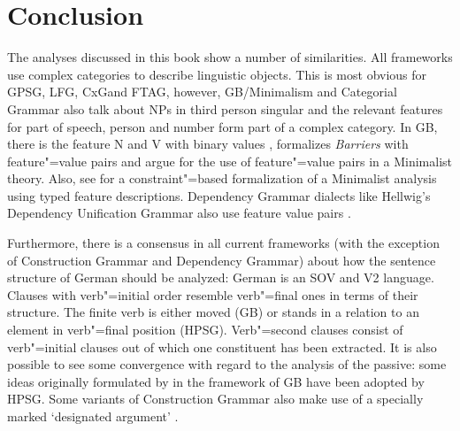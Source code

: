 \chapter{Conclusion}

The analyses discussed in this book show a number of similarities. All frameworks use complex categories to describe linguistic objects. This is most obvious for GPSG\indexgpsg,
LFG\indexlfg, CxG\indexcxg and FTAG\indextag, however, GB/Minimalism and Categorial Grammar also talk about NPs in third person singular and the relevant features for part of
speech, person and number form part of a complex category. In GB, there is the feature N and V with binary values \citep[]{Chomsky70a}, \citet[]{Stabler92a-u} formalizes \emph{Barriers} with feature"=value pairs and \citet[--291]{SE2002a} argue for the use of feature"=value pairs in a Minimalist theory\indexmp. Also, see \citet[\page]{Veenstra98a} for a constraint"=based formalization
of a Minimalist analysis using typed feature descriptions. Dependency Grammar dialects like
Hellwig's Dependency Unification Grammar also use feature value
pairs \citep[]{Hellwig2003a}.

Furthermore, there is a consensus in all current frameworks (with the exception of Construction
Grammar and Dependency Grammar) about how the sentence structure of German should
be analyzed: German is an SOV and V2 language. Clauses with verb"=initial order resemble verb"=final ones in terms of their structure. The finite verb is
either moved (GB) or stands in a relation to an element in verb"=final position (HPSG). Verb"=second
clauses consist of  verb"=initial clauses out of which one constituent has been extracted. It is also possible to see some convergence with regard to the analysis of the passive: some ideas originally formulated
by \citet{Haider84b,Haider85b,Haider86} in the framework of GB have been adopted by HPSG. Some
variants of Construction Grammar also make use of a specially marked `designated
argument' \citep[--57]{MR2001a}.

